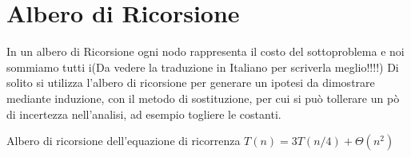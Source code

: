 \section{Albero di Ricorsione}
In un albero di Ricorsione ogni nodo rappresenta il costo del sottoproblema e noi
sommiamo tutti i(Da vedere la traduzione in Italiano per scriverla meglio!!!!)
Di solito si utilizza l'albero di ricorsione per generare un ipotesi da dimostrare
mediante induzione, con il metodo di sostituzione, per cui si può tollerare un pò
di incertezza nell'analisi, ad esempio togliere le costanti.

Albero di ricorsione dell'equazione di ricorrenza $T(n) = 3T(n/4) + \Theta(n^2)$


